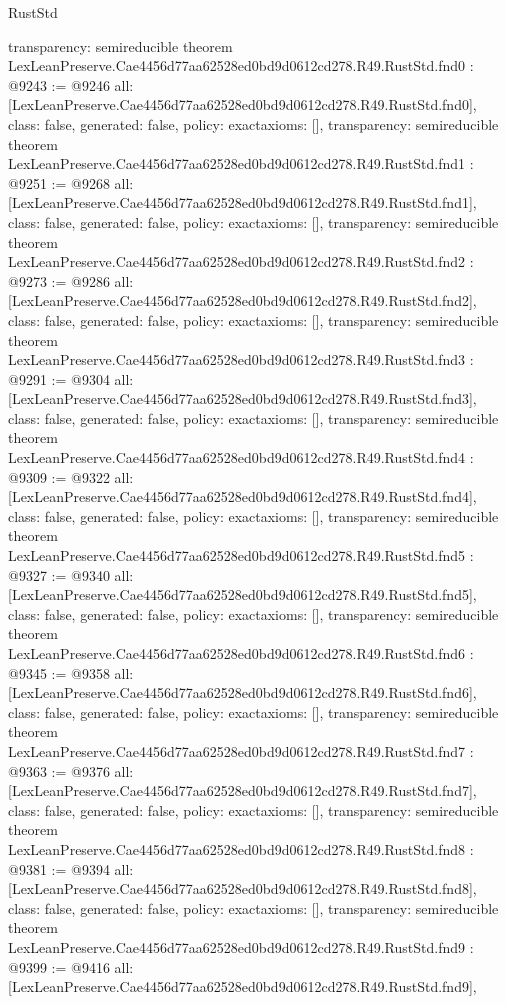 \begin{lexlean}{RustStd}
\begin{coremodule}
{  transparency: semireducible
}
theorem LexLeanPreserve.Cae4456d77aa62528ed0bd9d0612cd278.R49.RustStd.fnd0 : @9243 := @9246 {
  all: [LexLeanPreserve.Cae4456d77aa62528ed0bd9d0612cd278.R49.RustStd.fnd0],
  class: false,
  generated: false,
  policy: exact{axioms: []},
  transparency: semireducible
}
theorem LexLeanPreserve.Cae4456d77aa62528ed0bd9d0612cd278.R49.RustStd.fnd1 : @9251 := @9268 {
  all: [LexLeanPreserve.Cae4456d77aa62528ed0bd9d0612cd278.R49.RustStd.fnd1],
  class: false,
  generated: false,
  policy: exact{axioms: []},
  transparency: semireducible
}
theorem LexLeanPreserve.Cae4456d77aa62528ed0bd9d0612cd278.R49.RustStd.fnd2 : @9273 := @9286 {
  all: [LexLeanPreserve.Cae4456d77aa62528ed0bd9d0612cd278.R49.RustStd.fnd2],
  class: false,
  generated: false,
  policy: exact{axioms: []},
  transparency: semireducible
}
theorem LexLeanPreserve.Cae4456d77aa62528ed0bd9d0612cd278.R49.RustStd.fnd3 : @9291 := @9304 {
  all: [LexLeanPreserve.Cae4456d77aa62528ed0bd9d0612cd278.R49.RustStd.fnd3],
  class: false,
  generated: false,
  policy: exact{axioms: []},
  transparency: semireducible
}
theorem LexLeanPreserve.Cae4456d77aa62528ed0bd9d0612cd278.R49.RustStd.fnd4 : @9309 := @9322 {
  all: [LexLeanPreserve.Cae4456d77aa62528ed0bd9d0612cd278.R49.RustStd.fnd4],
  class: false,
  generated: false,
  policy: exact{axioms: []},
  transparency: semireducible
}
theorem LexLeanPreserve.Cae4456d77aa62528ed0bd9d0612cd278.R49.RustStd.fnd5 : @9327 := @9340 {
  all: [LexLeanPreserve.Cae4456d77aa62528ed0bd9d0612cd278.R49.RustStd.fnd5],
  class: false,
  generated: false,
  policy: exact{axioms: []},
  transparency: semireducible
}
theorem LexLeanPreserve.Cae4456d77aa62528ed0bd9d0612cd278.R49.RustStd.fnd6 : @9345 := @9358 {
  all: [LexLeanPreserve.Cae4456d77aa62528ed0bd9d0612cd278.R49.RustStd.fnd6],
  class: false,
  generated: false,
  policy: exact{axioms: []},
  transparency: semireducible
}
theorem LexLeanPreserve.Cae4456d77aa62528ed0bd9d0612cd278.R49.RustStd.fnd7 : @9363 := @9376 {
  all: [LexLeanPreserve.Cae4456d77aa62528ed0bd9d0612cd278.R49.RustStd.fnd7],
  class: false,
  generated: false,
  policy: exact{axioms: []},
  transparency: semireducible
}
theorem LexLeanPreserve.Cae4456d77aa62528ed0bd9d0612cd278.R49.RustStd.fnd8 : @9381 := @9394 {
  all: [LexLeanPreserve.Cae4456d77aa62528ed0bd9d0612cd278.R49.RustStd.fnd8],
  class: false,
  generated: false,
  policy: exact{axioms: []},
  transparency: semireducible
}
theorem LexLeanPreserve.Cae4456d77aa62528ed0bd9d0612cd278.R49.RustStd.fnd9 : @9399 := @9416 {
  all: [LexLeanPreserve.Cae4456d77aa62528ed0bd9d0612cd278.R49.RustStd.fnd9],
}
\end{coremodule}
\end{lexlean}
